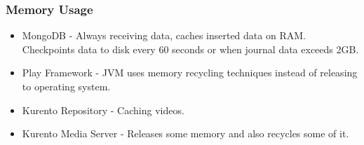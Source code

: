 \documentclass[compress]{beamer}
\begin{document}
	\begin{frame}[c]
		\frametitle{Memory Usage}

		\begin{itemize}
				\vfill
				\item MongoDB - Always receiving data, caches inserted data on RAM. Checkpoints data to disk every 60 seconds or when journal data exceeds
2GB.
				\vfill 
				\item Play Framework - JVM uses memory recycling techniques instead of releasing to operating system.
				\vfill
				\item Kurento Repository - Caching videos.
				\vfill
				\item Kurento Media Server - Releases some memory and also recycles some of it.

		\end{itemize}
	\end{frame}

\end{document}
